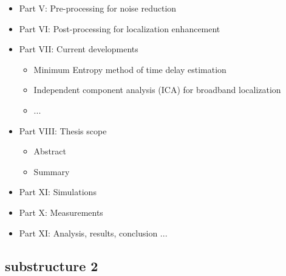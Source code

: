 \begin{itemize}
    \item Part V: Pre-processing for noise reduction
    
    \item Part VI: Post-processing for localization enhancement
    
    \item Part VII: Current developments
    \begin{itemize}
        \item Minimum Entropy method of time delay estimation
        \item Independent component analysis (ICA) for broadband localization
        \item ...
    \end{itemize}
    
    \item Part VIII: Thesis scope
    \begin{itemize}
        \item Abstract
        \item Summary
    \end{itemize}
    
    \item Part XI: Simulations
    
    \item Part X: Measurements
    
    \item Part XI: Analysis, results, conclusion ...
    
\end{itemize}



\subsection{substructure 2}

